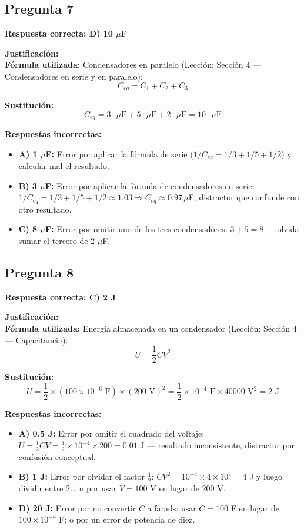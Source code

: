\begin{respuestabox}
\subsection{Pregunta 7}
\textcolor{verdecorrecto}{\textbf{Respuesta correcta: D) 10 $\mu$F}}

\textbf{Justificación:}\\
\textbf{Fórmula utilizada:} Condensadores en paralelo (Lección: Sección 4 — Condensadores en serie y en paralelo):
$$C_{eq} = C_1 + C_2 + C_3$$

\textbf{Sustitución:}
$$C_{eq} = 3 \text{ }\mu\text{F} + 5 \text{ }\mu\text{F} + 2 \text{ }\mu\text{F} = 10 \text{ }\mu\text{F}$$

\textbf{Respuestas incorrectas:}
\begin{itemize}
    \item \textbf{A) 1 $\mu$F:} Error por aplicar la fórmula de serie ($1/C_{eq} = 1/3+1/5+1/2$) y calcular mal el resultado.
    \item \textbf{B) 3 $\mu$F:} Error por aplicar la fórmula de condensadores en serie: $1/C_{eq} = 1/3+1/5+1/2 \approx 1.03 \Rightarrow C_{eq} \approx 0.97\,\mu$F; distractor que confunde con otro resultado.
    \item \textbf{C) 8 $\mu$F:} Error por omitir uno de los tres condensadores: $3 + 5 = 8$ — olvida sumar el tercero de 2 $\mu$F.
\end{itemize}
\end{respuestabox}

\begin{respuestabox}
\subsection{Pregunta 8}
\textcolor{verdecorrecto}{\textbf{Respuesta correcta: C) 2 J}}

\textbf{Justificación:}\\
\textbf{Fórmula utilizada:} Energía almacenada en un condensador (Lección: Sección 4 — Capacitancia):
$$U = \frac{1}{2} C V^2$$

\textbf{Sustitución:}
$$U = \frac{1}{2} \times (100 \times 10^{-6} \text{ F}) \times (200 \text{ V})^2 = \frac{1}{2} \times 10^{-4} \text{ F} \times 40000 \text{ V}^2 = 2 \text{ J}$$

\textbf{Respuestas incorrectas:}
\begin{itemize}
    \item \textbf{A) 0.5 J:} Error por omitir el cuadrado del voltaje: $U = \frac{1}{2} C V = \frac{1}{2} \times 10^{-4} \times 200 = 0.01$ J — resultado inconsistente, distractor por confusión conceptual.
    \item \textbf{B) 1 J:} Error por olvidar el factor $\frac{1}{2}$: $C V^2 = 10^{-4} \times 4\times10^4 = 4$ J y luego dividir entre 2... o por usar $V = 100$ V en lugar de 200 V.
    \item \textbf{D) 20 J:} Error por no convertir $C$ a farads: usar $C = 100$ F en lugar de $100 \times 10^{-6}$ F; o por un error de potencia de diez.
\end{itemize}
\end{respuestabox}

